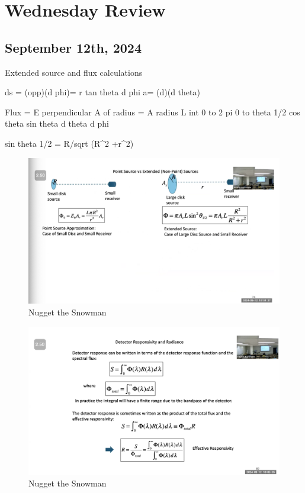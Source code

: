 \documentclass{article}
\begin{document}
\clearpage


\section{Wednesday Review}


\subsection{September 12th, 2024}

Extended source and flux calculations

ds = (opp)(d phi)= r tan theta d phi 
a= (d)(d theta)

Flux = E perpendicular A of radius = A radius L int 0 to 2 pi 0 to theta 1/2 cos theta sin theta d theta d phi 

sin theta 1/2 = R/sqrt (R^2 +r^2)

\begin{figure}[h!]
\centering
\includegraphics[scale=.6]{Radiometry/Week3/Notes/sept12th.png}
\caption{Nugget the Snowman}
\label{fig:Sept 12}
\end{figure}

\begin{figure}[h!]
\centering
\includegraphics[scale=.6]{Radiometry/Week3/Notes/Sept12Responsivity.png}
\caption{Nugget the Snowman}
\label{fig:Sept Responsivity}
\end{figure}
\end{document}
